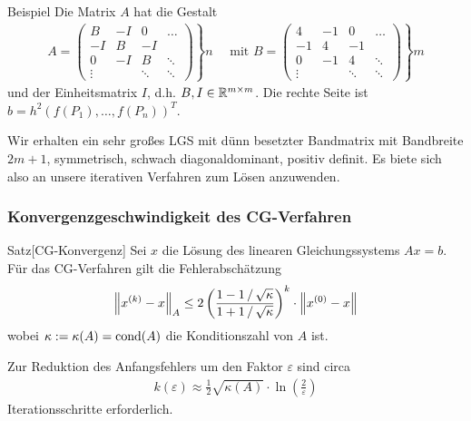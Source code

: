\begin{colboxBreakable}{Beispiel}
  Die Matrix $A$ hat die Gestalt
  \begin{align*}A = \left.
    \begin{pmatrix}
      B & -I & 0 & \dots\\
      -I & B & -I & \\
      0 & -I & B & \ddots \\
      \vdots& & \ddots & \ddots
    \end{pmatrix}\right\} n \quad \text{ mit } B = \left.\begin{pmatrix}
      4 & -1 & 0 & \dots\\
      -1 & 4 & -1 & \\
      0 & -1 & 4 & \ddots \\
      \vdots& & \ddots & \ddots
    \end{pmatrix}\right\}m
  \end{align*}
  und der Einheitsmatrix $I$, d.h. $B,I\in\mathbb R^{m\times m}$. 
  Die rechte Seite ist $b=h^2(f(P_1),\dots,f(P_n))^T$. 
  
  Wir erhalten ein sehr großes LGS mit dünn besetzter Bandmatrix mit Bandbreite $2m+1$, symmetrisch, 
  schwach diagonaldominant, positiv definit. Es biete sich also an unsere iterativen Verfahren zum Lösen 
  anzuwenden.
\end{colboxBreakable}

\subsubsection{Konvergenzgeschwindigkeit des CG-Verfahren}

\begin{colbox}{Satz}[CG-Konvergenz]\label{satz:CGVconv}
  Sei $x$ die Lösung des linearen Gleichungssystems $Ax=b$. Für das CG-Verfahren gilt die Fehlerabschätzung
  \begin{align*}
    \vertn{2}{x^{(k)} - x}_A 
    \leq 2\left(\dfrac{1-1\,/\,\sqrt{\kappa}}{1+1\,/\,\sqrt{\kappa}}\right)^k \cdot \vertn{2}{x^{(0)}-x}
  \end{align*}
  wobei $\kappa := \kappa(A) = \operatorname*{cond}(A)$ die Konditionszahl von $A$ ist.
  
  Zur Reduktion des Anfangsfehlers um den Faktor $\varepsilon$ sind circa 
  \begin{align*}
    k(\varepsilon)\approx \tfrac{1}{2}\sqrt{\kappa(A)}\cdot \ln(\tfrac{2}{\varepsilon})
  \end{align*}
  Iterationsschritte erforderlich. 
\end{colbox}

